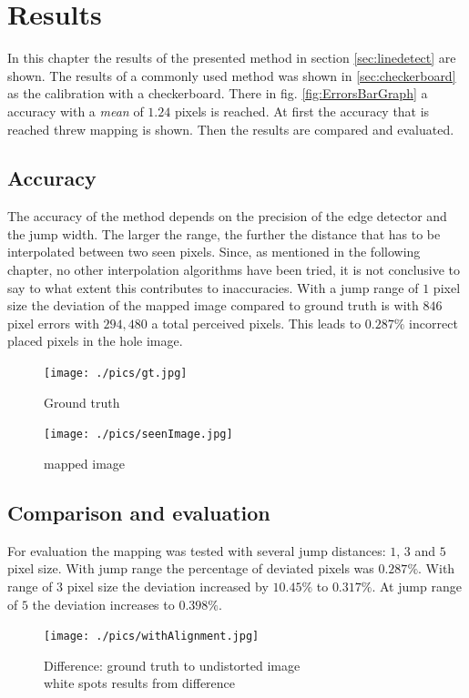 \documentclass[journal,final,a4paper,twoside]{PS}
\begin{document}
\section{Results}
\label{sec:results}
In this chapter the results of the presented method in section \ref{sec:linedetect} are shown. The results of a commonly used method was shown in \ref{sec:checkerboard} as the calibration with a checkerboard. There in fig. \ref{fig:ErrorsBarGraph} a accuracy with a \emph{mean} of $1.24$ pixels is reached. At first the accuracy that is reached threw mapping is shown. Then the results are compared and evaluated.
\subsection{Accuracy}

The accuracy of the method depends on the precision of the edge detector and the jump width. The larger the range, the further the distance that has to be interpolated between two seen pixels. Since, as mentioned in the following chapter, no other interpolation algorithms have been tried, it is not conclusive to say to what extent this contributes to inaccuracies. With a jump range of $1$ pixel size the deviation of the mapped image compared to ground truth is with $846$ pixel errors with $294,480$ a total perceived pixels. This leads to $0.287\%$ incorrect placed pixels in the hole image.

\begin{figure}[h]
\centering
\parbox{4cm}{
\texttt{[image: ./pics/gt.jpg]}
\caption{Ground truth}
\label{fig:gt}}
\qquad
\begin{minipage}{4cm}
\texttt{[image: ./pics/seenImage.jpg]}
\caption{mapped image}
\label{fig:undistImage}
\end{minipage}
\end{figure}



\subsection{Comparison and evaluation}
\label{sec:conclusion}
For evaluation the mapping was tested with several jump distances: $1$, $3$ and $5$ pixel size. With jump range the percentage of deviated pixels was $0.287\%$. With range of $3$ pixel size the deviation increased by $10.45\%$ to $0.317\%$. At jump range of $5$ the deviation increases to $0.398\%$. 

\begin{figure}[h]
\begin{center}
\texttt{[image: ./pics/withAlignment.jpg]}
\caption{Difference: ground truth to undistorted image\\ white spots results from difference}
\label{fig:diff}
\end{center}
\end{figure}
\end{document}
